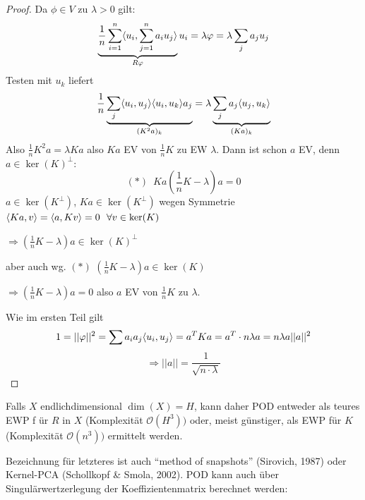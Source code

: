 \begin{satz}
\begin{proof}
	 Da $\phi \in V$ zu $\lambda > 0$ gilt:
	 \[
	 	\underbrace{\frac{1}{n} \sum\limits_{i=1}^n \langle u_i, \sum\limits_{j=1}^n a_i u_j \rangle}_{R \varphi} u_i = \lambda \varphi = \lambda \sum_j a_j u_j
	 \]
	 Testen mit $u_k$ liefert
	 \[
	 	\frac{1}{n} \underbrace{\sum_j \langle u_i, u_j \rangle \langle u_i, u_k \rangle a_j}_{(K^2 a)_k} = \lambda \underbrace{\sum_j a_j \langle u_j, u_k \rangle}_{(Ka)_k}
	 \]
	 Also $\frac{1}{n} K^2 a= \lambda Ka$ also $Ka$ EV von $\frac{1}{n} K$ zu EW $\lambda$. Dann ist schon $a$ EV, denn $a \in \ker(K)^{\perp}$:
	 \[
	  (\ast) \,\,\, Ka (\frac{1}{n} K - \lambda) a = 0
	 \]
	 $a \in \ker(K^{\perp})$, $Ka \in \ker(K^{\perp})$ wegen Symmetrie $\langle Ka, v \rangle = \langle a, Kv \rangle = 0 \,\,\,\, \forall v \in \ker(K)$
	 
	 $\Rightarrow (\frac{1}{n} K - \lambda) a \in \ker(K)^{\perp}$
	 
	 aber auch wg. $(\ast)$ $(\frac{1}{n} K - \lambda)a \in \ker(K)$
	 
	 $\Rightarrow (\frac{1}{n} K - \lambda) a = 0$ also $a$ EV von $\frac{1}{n}K$ zu $\lambda$.
	 
	 Wie im ersten Teil gilt
	 \[
	 	1 = || \varphi ||^2 = \sum a_i a_j \langle u_i, u_j \rangle = a^T K a = a^T \cdot n \lambda a = n \lambda a ||a||^2
	 \]
	 \[
		\Rightarrow ||a||= \frac{1}{\sqrt{n \cdot \lambda}}	 
	 \]
\end{proof}
\end{satz}

\begin{bem}
	Falls $X$ endlichdimensional $\dim(X) = H$, kann daher POD entweder als teures EWP f ür $R$ in $X$ (Komplexität $\mathcal{O}(H^3))$ oder, meist günstiger, als EWP für $K$ (Komplexität $\mathcal{O}(n^3))$ ermittelt werden.
	
	Bezeichnung für letzteres ist auch ``method of snapshots'' (Sirovich, 1987) oder Kernel-PCA (Schollkopf \& Smola, 2002).
	POD kann auch über Singulärwertzerlegung der Koeffizientenmatrix  berechnet werden:
\end{bem}


